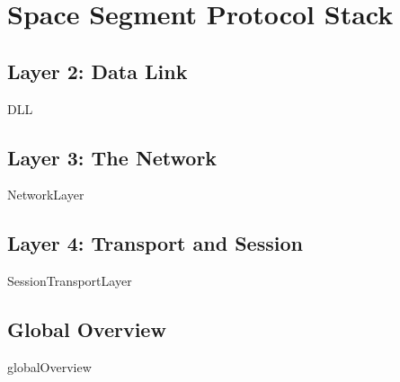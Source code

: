 \chapter{Space Segment Protocol Stack}

\section{Layer 2: Data Link}
{DLL}

\section{Layer 3: The Network}
{NetworkLayer}

\section{Layer 4: Transport and Session}
{SessionTransportLayer}

\section{Global Overview}
{globalOverview}